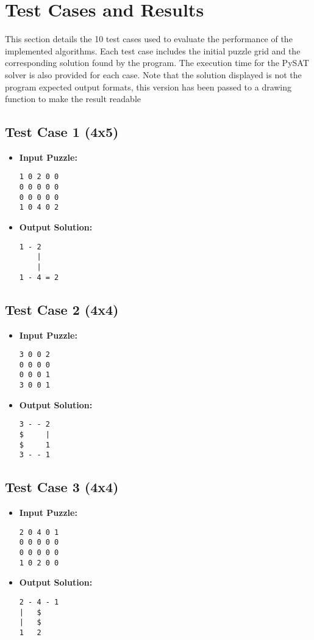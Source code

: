 \section{Test Cases and Results}
This section details the 10 test cases used to evaluate the performance of the implemented algorithms. Each test case includes the initial puzzle grid and the corresponding solution found by the program. The execution time for the PySAT solver is also provided for each case.
Note that the solution displayed is not the program expected output formats, this version has been passed to a drawing function to make the result readable
\subsection{Test Case 1 (4x5)}
\begin{itemize}
    \item \textbf{Input Puzzle:}
    \begin{verbatim}
1 0 2 0 0
0 0 0 0 0
0 0 0 0 0
1 0 4 0 2
    \end{verbatim}
    \item \textbf{Output Solution:}
    \begin{verbatim}
1 - 2    
    |    
    |    
1 - 4 = 2
    \end{verbatim}
\end{itemize}

\subsection{Test Case 2 (4x4)}
\begin{itemize}
    \item \textbf{Input Puzzle:}
    \begin{verbatim}
3 0 0 2
0 0 0 0
0 0 0 1
3 0 0 1
    \end{verbatim}
    \item \textbf{Output Solution:}
    \begin{verbatim}
3 - - 2
$     |
$     1
3 - - 1
    \end{verbatim}
\end{itemize}

\subsection{Test Case 3 (4x4)}
\begin{itemize}
    \item \textbf{Input Puzzle:}
    \begin{verbatim}
2 0 4 0 1
0 0 0 0 0
0 0 0 0 0
1 0 2 0 0
    \end{verbatim}
    \item \textbf{Output Solution:}
    \begin{verbatim}
2 - 4 - 1
|   $    
|   $    
1   2    
    \end{verbatim}
\end{itemize}

